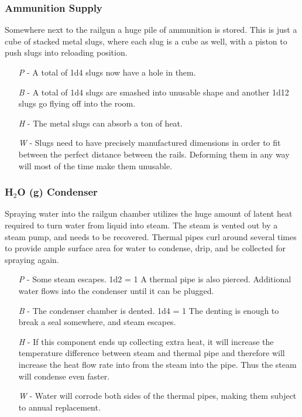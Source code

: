 \documentclass[a4paper]{article}
\begin{document}
\vspace{-0.5cm} \hspace{-18pt} \subsubsection{Ammunition Supply} \label{railgun_ammunition} \vspace{-0.2cm}
Somewhere next to the railgun a huge pile of ammunition is stored. This is just a cube of stacked metal slugs, where each slug is a cube as well, with a piston to push slugs into reloading position.
\begin{enumerate}
\item [\textit{P}] - A total of 1d4 slugs now have a hole in them.
\item [\textit{B}] - A total of 1d4 slugs are smashed into unusable shape and another 1d12 slugs go flying off into the room.
\item [\textit{H}] - The metal slugs can absorb a ton of heat.
\item [\textit{W}] - Slugs need to have precisely manufactured dimensions in order to fit between the perfect distance between the rails. Deforming them in any way will most of the time make them unusable.
\end{enumerate}

\vspace{-0.5cm} \hspace{-18pt} \subsubsection{H$_2$O (g) Condenser} \label{railgun_h2o_condenser} \vspace{-0.2cm}
Spraying water into the railgun chamber utilizes the huge amount of latent heat required to turn water from liquid into steam. The steam is vented out by a steam pump, and needs to be recovered. Thermal pipes curl around several times to provide ample surface area for water to condense, drip, and be collected for spraying again.
\begin{enumerate}
\item [\textit{P}] - Some steam escapes. \newline \hspace*{3pt} 1d2 = 1 A thermal pipe is also pierced. Additional water flows into the condenser until it can be plugged.
\item [\textit{B}] - The condenser chamber is dented. \newline \hspace*{3pt} 1d4 = 1 The denting is enough to break a seal somewhere, and steam escapes.
\item [\textit{H}] - If this component ends up collecting extra heat, it will increase the temperature difference between steam and thermal pipe and therefore will increase the heat flow rate into from the steam into the pipe. Thus the steam will condense even faster.
\item [\textit{W}] - Water will corrode both sides of the thermal pipes, making them subject to annual replacement.
\end{enumerate}
\end{document}
